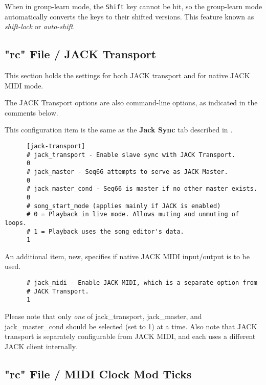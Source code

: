    When in group-learn mode, the \texttt{Shift} key cannot be hit, so the
   group-learn mode automatically converts the keys to their shifted versions.
   This feature known as \textsl{shift-lock} or \textsl{auto-shift}.

\subsection{"rc" File / JACK Transport}
\label{subsec:rc_file_jack_transport}

   This section holds the settings for both JACK transport and for native JACK
   MIDI mode.

   The JACK Transport options are also command-line options, as indicated in
   the comments below.

   This configuration item is the same as the 
   \textbf{Jack Sync} tab described in
   .

   \begin{verbatim}
      [jack-transport]
      # jack_transport - Enable slave sync with JACK Transport.
      0
      # jack_master - Seq66 attempts to serve as JACK Master.
      0
      # jack_master_cond - Seq66 is master if no other master exists.
      0
      # song_start_mode (applies mainly if JACK is enabled)
      # 0 = Playback in live mode. Allows muting and unmuting of loops.
      # 1 = Playback uses the song editor's data.
      1
   \end{verbatim}

   An additional item, new, specifies if native JACK MIDI input/output is to be
   used.

   \begin{verbatim}
      # jack_midi - Enable JACK MIDI, which is a separate option from
      # JACK Transport.
      1
   \end{verbatim}

   Please note that only \textsl{one} of
   jack\_transport, jack\_master, and jack\_master\_cond should be selected
   (set to 1) at a time.
   Also note that JACK transport is separately configurable from
   JACK MIDI, and each uses a different JACK client internally.

\subsection{"rc" File / MIDI Clock Mod Ticks}
\label{subsec:rc_file_midi_cmt}

